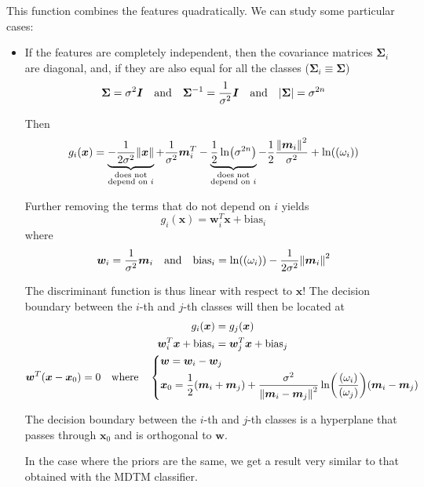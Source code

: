 \documentclass[oneside,onecolumn]{report}
\let\P\relax
\DeclareMathOperator*{\P}{P}
\begin{document}
This function combines the features quadratically.
We can study some particular cases:
\begin{itemize}
    \item
    If the features are completely independent, then the covariance matrices $\bm \Sigma_i$ are diagonal, and, if they are also equal for all the classes ($\bm \Sigma_i \equiv \bm \Sigma$)
    $$ \bm \Sigma = \sigma^2 \bm I \quad \text{and} \quad \bm \Sigma^{-1} = \frac{1}{\sigma^2} \bm I \quad \text{and} \quad \abs{\bm \Sigma} = \sigma^{2 n} $$

    Then
    $$ g_i(\bm x)
    =
    \underbrace{-\frac{1}{2 \sigma^2} \norm{\bm x}}_{\substack{\text{does not} \\ \text{depend on } i}}
    + \frac{1}{\sigma^2} \bm m_i^T
    - \underbrace{\frac{1}{2} \ln(\sigma^{2 n})}_{\substack{\text{does not} \\ \text{depend on } i}}
    - \frac{1}{2} \frac{\norm{\bm m_i}^2}{\sigma^2}
    + \ln(\P(\omega_i)) $$

    Further removing the terms that do not depend on $i$ yields
    $$ g_i(\bm x) = \bm w_i^T \bm x + \text{bias}_i $$
    where
    $$ \bm w_i = \frac{1}{\sigma^2} \bm m_i \quad \text{and} \quad \text{bias}_i = \ln(\P(\omega_i)) - \frac{1}{2 \sigma^2} \norm{\bm m_i}^2 $$

    The discriminant function is thus linear with respect to $\bm x$!
    The decision boundary between the $i$-th and $j$-th classes will then be located at
    \begin{gather*}
        g_i(\bm x) = g_j(\bm x) \\
        \bm w_i^T \bm x + \text{bias}_i = \bm w_j^T \bm x + \text{bias}_j \\
        \bm w^T (\bm x - \bm x_0) = 0 \quad \text{where} \quad \begin{dcases}
            \bm w = \bm w_i - \bm w_j \\
            \bm x_0 = \frac{1}{2} (\bm m_i + \bm m_j) + \frac{\sigma^2}{\norm{\bm m_i - \bm m_j}^2} \ln(\frac{\P(\omega_i)}{\P(\omega_j)}) (\bm m_i - \bm m_j)
        \end{dcases}
    \end{gather*}

    The decision boundary between the $i$-th and $j$-th classes is a hyperplane that passes through $\bm x_0$ and is orthogonal to $\bm w$.

    In the case where the priors are the same, we get a result very similar to that obtained with the MDTM classifier.


\end{itemize}
\end{document}

